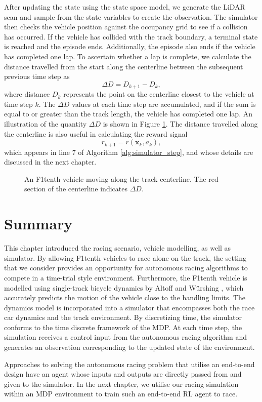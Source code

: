 After updating the state using the state space model, we generate the LiDAR scan and sample from the state variables to create the observation.
The simulator then checks the vehicle position against the occupancy grid to see if a collision has occurred.
If the vehicle has collided with the track boundary, a terminal state is reached and the episode ends.
Additionally, the episode also ends if the vehicle has completed one lap.
To ascertain whether a lap is complete, we calculate the distance travelled from the start along the centerline between the subsequent previous time step as
\begin{equation}
    \Delta D = D_{k+1} - D_{k},
\end{equation}
where distance $D_k$ represents the point on the centerline closest to the vehicle at time step $k$.
The $\Delta D$ values at each time step are accumulated, and if the sum is equal to or greater than the track length, the vehicle has completed one lap.
An illustration of the quantity $\Delta D$ is shown in Figure \ref{fig:centerline_distance}.
The distance travelled along the centerline is also useful in calculating the reward signal
\begin{equation}
    r_{k+1} = r(\mathbf{x}_k, a_k),
\end{equation}
which appears in line 7 of Algorithm \ref{alg:simulator_step}, and whose details are discussed in the next chapter.
\begin{figure}[htb!]
    \centering
    
    \caption[A vehicle moving along the track centerline]{An F1tenth vehicle moving along the track centerline. The red section of the centerline indicates $\Delta D$.}
    \label{fig:centerline_distance}
\end{figure}


\section{Summary}

This chapter introduced the racing scenario, vehicle modelling, as well as simulator.
By allowing F1tenth vehicles to race alone on the track, the setting that we consider provides an opportunity for autonomous racing algorithms to compete in a time-trial style environment.
Furthermore, the F1tenth vehicle is modelled using single-track bicycle dynamics by Altoff and  W\"{u}rshing \cite{Althoff2020}, which accurately predicts the motion of the vehicle close to the handling limits.
The dynamics model is incorporated into a simulator that encompasses both the race car dynamics and the track environment. 
By discretizing time, the simulator conforms to the time discrete framework of the MDP. 
At each time step, the simulation receives a control input from the autonomous racing algorithm and generates an observation corresponding to the updated state of the environment. 

Approaches to solving the autonomous racing problem that utilise an end-to-end design have an agent whose inputs and outputs
are directly passed from and given to the simulator.
In the next chapter, we utilise our racing simulation within an MDP environment to train such an end-to-end RL agent to race.